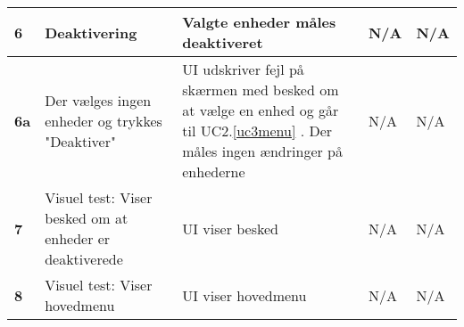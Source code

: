 \begin{center}
\begin{longtable}{|p{}|p{}|p{}|p{}|p{}|}
\textbf{6}			&Deaktivering			
					&Valgte enheder måles deaktiveret
					&N/A 
					&N/A \\\hline
															
\textbf{6a}			&Der vælges ingen enheder og trykkes "Deaktiver"				
					&UI udskriver fejl på skærmen med besked om at vælge en enhed og går til UC2.\ref{uc3menu}	. 
					 Der måles ingen ændringer på enhederne
					&N/A 
					&N/A \\\hline
		
\textbf{7}			&Visuel test: Viser besked om at enheder er deaktiverede
					&UI viser besked
					&N/A
					&N/A \\\hline
					
\textbf{8}			&Visuel test: Viser hovedmenu
					&UI viser hovedmenu
					&N/A
					&N/A \\\hline
					

	\end{longtable}
	\label{ATUC3} 
\end{center}
